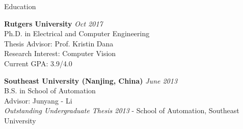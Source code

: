 \documentclass{resume} %
\begin{document}
\begin{rSection}{Education}

{\bf Rutgers University} \hfill {\em Oct 2017} \\
Ph.D. in Electrical and Computer Engineering \\
Thesis Advisor: Prof. Kristin Dana \\
Research Interest: Computer Vision\\
Current GPA: 3.9/4.0

{\bf Southeast University (Nanjing, China)} \hfill {\em June 2013} \\
B.S. in School of Automation \\
Advisor: Junyang - Li \\
 {\it Outstanding Undergraduate Thesis 2013} - School of Automation, Southeast University%
\end{rSection}






\end{document}
